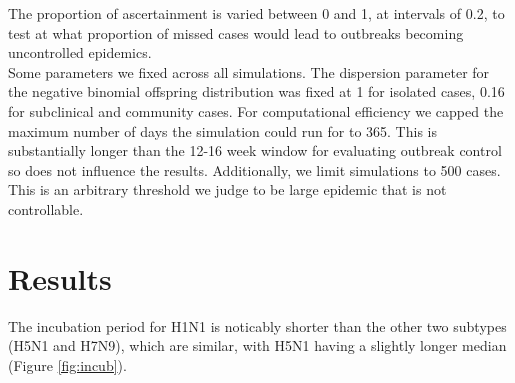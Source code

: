 \documentclass{article}
\begin{document}
The proportion of ascertainment is varied between 0 and 1, at intervals of 0.2, to test at what proportion of missed cases would lead to outbreaks becoming uncontrolled epidemics. \\

Some parameters we fixed across all simulations. The dispersion parameter for the negative binomial offspring distribution was fixed at 1 for isolated cases, 0.16 for subclinical and community cases. For computational efficiency we capped the maximum number of days the simulation could run for to 365. This is substantially longer than the 12-16 week window for evaluating outbreak control so does not influence the results. Additionally, we limit simulations to 500 cases. This is an arbitrary threshold we judge to be large epidemic that is not controllable. \\

\section*{Results}

The incubation period for H1N1 is noticably shorter than the other two subtypes (H5N1 and H7N9), which are similar, with H5N1 having a slightly longer median (Figure \ref{fig:incub}). \\
\end{document}
